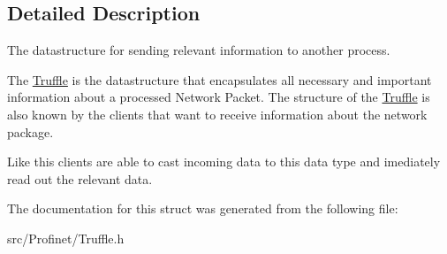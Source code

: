 \subsection{Detailed Description}
The datastructure for sending relevant information to another process. 

The \hyperlink{struct_truffle}{Truffle} is the datastructure that encapsulates all necessary and important information about a processed Network Packet. The structure of the \hyperlink{struct_truffle}{Truffle} is also known by the clients that want to receive information about the network package.

Like this clients are able to cast incoming data to this data type and imediately read out the relevant data. 

The documentation for this struct was generated from the following file\+:\begin{DoxyCompactItemize}
\item 
src/\+Profinet/Truffle.\+h\end{DoxyCompactItemize}
